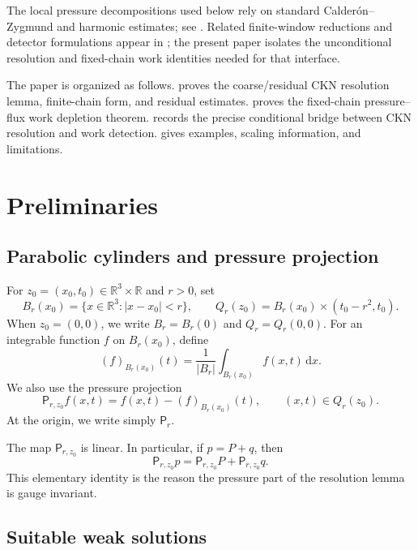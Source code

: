 \documentclass[10pt,a4paper]{amsart}
\numberwithin{equation}{section}
\newcommand{\R}{\mathbb R}
\newcommand{\dx}{\,\mathrm dx}
\newcommand{\Pf}{\mathsf P}
\begin{document}
The local pressure decompositions used below rely on standard Calder\'on--Zygmund and harmonic estimates; see \cite{Stein1970}.  Related finite-window reductions and detector formulations appear in \cite{Yu2026InvisibleCascades,Yu2026CriticalLedgers,Yu2026SingularityAudit,Yu2026ComputationalAntiPhantom,Yu2026SharpLocalToClean}; the present paper isolates the unconditional resolution and fixed-chain work identities needed for that interface.

The paper is organized as follows.   proves the coarse/residual CKN resolution lemma, finite-chain form, and residual estimates.   proves the fixed-chain pressure--flux work depletion theorem.   records the precise conditional bridge between CKN resolution and work detection.   gives examples, scaling information, and limitations.

\section{Preliminaries}

\subsection{Parabolic cylinders and pressure projection}

For $z_0=(x_0,t_0)\in\R^3\times\R$ and $r>0$, set
\[
B_r(x_0)=\{x\in\R^3: |x-x_0|<r\},
\qquad
Q_r(z_0)=B_r(x_0)\times(t_0-r^2,t_0).
\]
When $z_0=(0,0)$, we write $B_r=B_r(0)$ and $Q_r=Q_r(0,0)$.
For an integrable function $f$ on $B_r(x_0)$, define
\[
(f)_{B_r(x_0)}(t)=\frac{1}{|B_r|}\int_{B_r(x_0)} f(x,t)\dx.
\]
We also use the pressure projection
\begin{equation}\label{eq:pressure-projection}
\Pf_{r,z_0} f(x,t)=f(x,t)-(f)_{B_r(x_0)}(t),
\qquad (x,t)\in Q_r(z_0).
\end{equation}
At the origin, we write simply $\Pf_r$.

The map $\Pf_{r,z_0}$ is linear.  In particular, if $p=P+q$, then
\begin{equation}\label{eq:pressure-projection-linearity}
\Pf_{r,z_0}p=\Pf_{r,z_0}P+\Pf_{r,z_0}q.
\end{equation}
This elementary identity is the reason the pressure part of the resolution lemma is gauge invariant.

\subsection{Suitable weak solutions}
\end{document}
